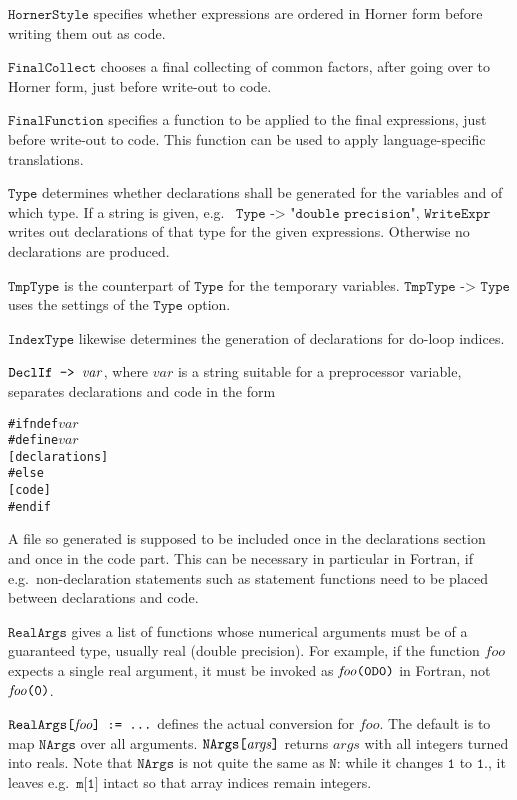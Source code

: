 \documentclass[twoside,11pt]{article}
\makeatletter
\def\indextt#1{\index{#1@\texttt{#1}}}
\def\Var#1{\ensuremath{\mathit{#1}}}
\def\Code#1{\ensuremath{\texttt{#1}}}
\def\eg{e.g.\ }
\makeatother
\begin{document}
\Code{HornerStyle} specifies whether expressions are ordered in Horner
form before writing them out as code.

\Code{FinalCollect} chooses a final collecting of common factors, after 
going over to Horner form, just before write-out to code.

\Code{FinalFunction} specifies a function to be applied to the final
expressions, just before write-out to code.  This function can be used
to apply language-specific translations.

\Code{Type} determines whether declarations shall be generated for
the variables and of which type.  If a string is given, \eg
\Code{Type -> "double precision"}, \Code{WriteExpr} writes out
declarations of that type for the given expressions.  Otherwise
no declarations are produced.

\Code{TmpType} is the counterpart of \Code{Type} for the temporary
variables.  \Code{TmpType -> Type} uses the settings of the \Code{Type}
option.

\Code{IndexType} likewise determines the generation of declarations 
for do-loop indices.

\Code{DeclIf -> \Var{var}}, where \Var{var} is a string suitable for a 
preprocessor variable, separates declarations and code in the form
\begin{alltt}
   #ifndef \Var{var}
   #define \Var{var}
   \textrm{[declarations]}
   #else
   \textrm{[code]}
   #endif
\end{alltt}
A file so generated is supposed to be included once in the declarations 
section and once in the code part.  This can be necessary in particular 
in Fortran, if \eg non-declaration statements such as statement 
functions need to be placed between declarations and code.

\Code{RealArgs} gives a list of functions whose numerical arguments must 
be of a guaranteed type, usually real (double precision).  For example, 
if the function \Var{foo} expects a single real argument, it must be 
invoked as \Code{\Var{foo}(0D0)} in Fortran, not \Code{\Var{foo}(0)}.

\Code{RealArgs[\Var{foo}] := ...} defines the actual conversion for
\Var{foo}.  The default is to map \Code{NArgs} over all arguments. 
\Code{NArgs[\Var{args}]} returns \Var{args} with all integers turned
into reals.  Note that \Code{NArgs} is not quite the same as \Code{N}:
while it changes \Code{1} to \Code{1.}, it leaves \eg \Code{m[1]} intact
so that array indices remain integers.%
\indextt{NArgs}
\end{document}
